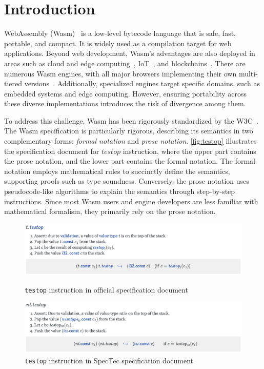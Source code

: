 
\chapter{Introduction}
\label{ch:intro}
\noindent

WebAssembly (Wasm)~\cite{wasm} is a low-level bytecode language that is safe, fast,
portable, and compact.
It is widely used as a compilation target for web applications.
Beyond web development, Wasm's advantages are also deployed in areas such as
cloud and edge computing~\cite{lucet, cloudflare}, IoT~\cite{wasm-iot}, and
blockchains~\cite{wasm-blockchain}.
There are numerous Wasm engines, with all major browsers implementing their own
multi-tiered versions~\cite{v8, spidermonkey, webkit}.
Additionally, specialized engines target specific domains, such as embedded
systems and edge computing.
However, ensuring portability across these diverse implementations introduces
the risk of divergence among them.


To address this challenge, Wasm has been rigorously standardized by the
W3C~\cite{wasm-w3c}.
The Wasm specification is particularly rigorous, describing its semantics in
two complementary forms: \textit{formal notation} and \textit{prose notation}.
\cref{fig:testop} illustrates the specification document for $testop$
instruction, where the upper part contains the prose notation, and the lower
part contains the formal notation.
The formal notation employs mathematical rules to succinctly define the
semantics, supporting proofs such as type soundness.
Conversely, the prose notation uses pseudocode-like algorithms to explain the
semantics through step-by-step instructions.
Since most Wasm users and engine developers are less familiar with mathematical
formalism, they primarily rely on the prose notation.

\begin{figure}[t]
    \centerline{\includegraphics[width=15cm]{fig/testop}}
    \caption[\texttt{testop} instruction in official specification document]
      {\texttt{testop} instruction in official specification document}
      \label{fig:testop}
    \centerline{\includegraphics[width=15cm]{fig/spectec-testop}}
    \caption[\texttt{testop} instruction in SpecTec specification document]
      {\texttt{testop} instruction in SpecTec specification document}
      \label{fig:spectec-testop}
\end{figure}


